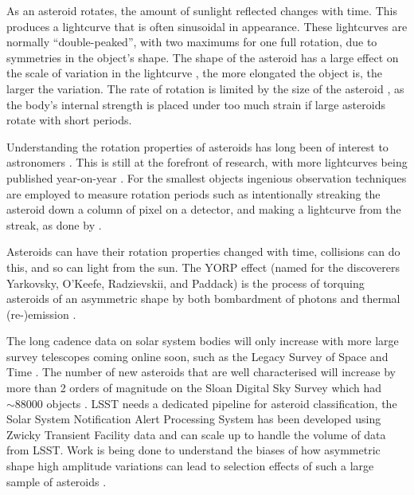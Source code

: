 \documentclass{UCreport}
\begin{document}
As an asteroid rotates, the amount of sunlight reflected changes with time.
This produces a lightcurve that is often sinusoidal in appearance.
These lightcurves are normally ``double-peaked'', with two maximums for one full rotation, due to symmetries in the object's shape. 
The shape of the asteroid has a large effect on the scale of variation in the lightcurve \citep{Durech2015}, the more elongated the object is, the larger the variation.
The rate of rotation is limited by the size of the asteroid \citep{Pravec2000}, as the body's internal strength is placed under too much strain if large
asteroids rotate with short periods.

Understanding the rotation properties of asteroids has long been of interest to astronomers \citep[e.g.][for early work into the limits of rotation period and the tumbling nature of some small bodies]{Weidenschilling1981,Harris1994}.
This is still at the forefront of research, with more lightcurves being published year-on-year \citep{Harris2015}.
For the smallest objects ingenious observation techniques are employed to measure rotation periods such as intentionally streaking the asteroid down a column of pixel on a detector, and making a lightcurve from the streak, as done by \citet{Bolin2023}.

Asteroids can have their rotation properties changed with time, collisions can do this, and so can light from the sun.
The YORP effect (named for the discoverers Yarkovsky, O'Keefe, Radzievskii, and Paddack) is the process of torquing asteroids of an asymmetric shape by both bombardment of photons and thermal (re-)emission \citep{Rubincam2000}.

The long cadence data on solar system bodies will only increase with more large survey telescopes coming online soon, such as the Legacy Survey of Space and Time \citep[LSST][]{LSST2019}.
The number of new asteroids that are well characterised will increase by more than 2 orders of magnitude on the Sloan Digital Sky Survey \citep[SDSS][]{York2000} which had $\sim 88000$ objects \citet{Parker2008}.
LSST needs a dedicated pipeline for asteroid classification, the Solar System Notification Alert Processing System \citep[SNAPS][]{Trilling2023} has been developed using Zwicky Transient Facility \citep[ZTF, ][]{Bellm2018} data and can scale up to handle the volume of data from LSST.
Work is being done to understand the biases of how  asymmetric shape high amplitude variations can lead to selection effects of such a large sample of asteroids \citet{Levine2023}.
\end{document}
